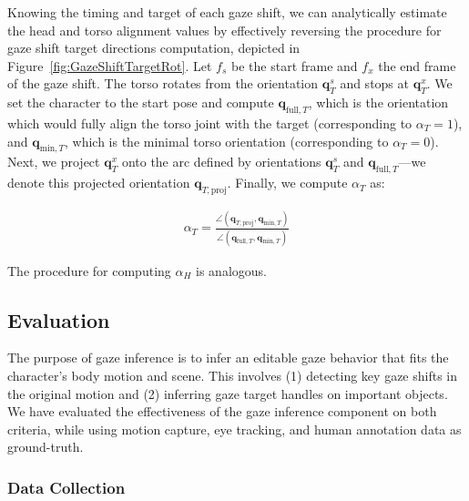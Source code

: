 Knowing the timing and target of each gaze shift, we can analytically estimate the head and torso alignment values by effectively reversing the procedure for gaze shift target directions computation, depicted in Figure~\ref{fig:GazeShiftTargetRot}. Let $f_s$ be the start frame and $f_x$ the end frame of the gaze shift. The torso rotates from the orientation $\mathbf{q}_T^s$ and stops at $\mathbf{q}_T^x$. We set the character to the start pose and compute $\mathbf{q}_{\mathrm{full},T}$, which is the orientation which would fully align the torso joint with the target (corresponding to $\alpha_T = 1$), and $\mathbf{q}_{\mathrm{min},T}$, which is the minimal torso orientation (corresponding to $\alpha_{T} = 0$). Next, we project $\mathbf{q}_{T}^x$ onto the arc defined by orientations $\mathbf{q}_{T}^s$ and $\mathbf{q}_{\mathrm{full},T}$---we denote this projected orientation $\mathbf{q}_{T,\mathrm{proj}}$. Finally, we compute $\alpha_T$ as:

\begin{align} \label{eq:GazeAlignmentInference}
\alpha_T = \frac{\angle(\mathbf{q}_{T,\mathrm{proj}}, \mathbf{q}_{\mathrm{min},T})}{\angle(\mathbf{q}_{\mathrm{full},T}, \mathbf{q}_{\mathrm{min},T})}
\end{align}

The procedure for computing $\alpha_{H}$ is analogous.

\subsection{Evaluation}
\label{sec:GazeInferenceEvaluation}

The purpose of gaze inference is to infer an editable gaze behavior that fits the character's body motion and scene. This involves (1) detecting key gaze shifts in the original motion and (2) inferring gaze target handles on important objects. We have evaluated the effectiveness of the gaze inference component on both criteria, while using motion capture, eye tracking, and human annotation data as ground-truth.

\subsubsection{Data Collection}

